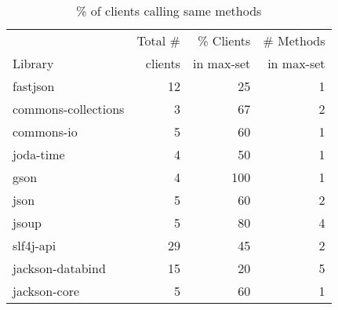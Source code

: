 \begin{table}[ht]
\centering
\caption{\label{tab:same-method}\% of clients calling same methods} 
\begingroup\scriptsize
\begin{tabular}{l!{\color{verylightgray}\vrule}rrr}
 & Total \# & \% Clients & \# Methods \\ 
Library & clients  & in max-set & in max-set\\
 \hline
fastjson & 12 & 25 & 1 \\ 
  commons-collections & 3 & 67 & 2 \\ 
  commons-io & 5 & 60 & 1 \\ 
  joda-time & 4 & 50 & 1 \\ 
  gson & 4 & 100 & 1 \\ 
  json & 5 & 60 & 2 \\ 
  jsoup & 5 & 80 & 4 \\ 
  slf4j-api & 29 & 45 & 2 \\ 
  jackson-databind & 15 & 20 & 5 \\ 
  jackson-core & 5 & 60 & 1 \\ 
\end{tabular}
\endgroup
\end{table}
